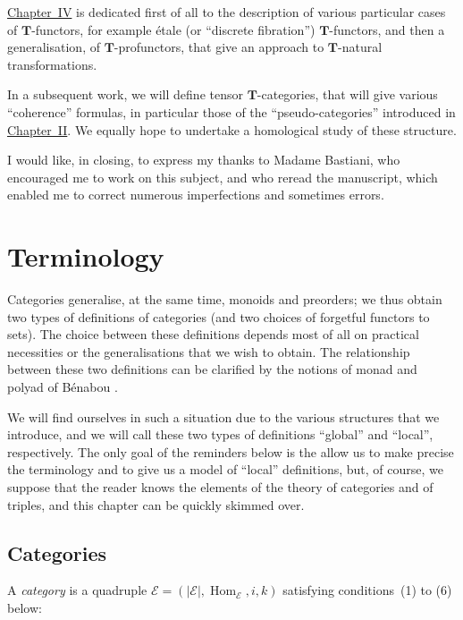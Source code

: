 \documentclass[fleqn]{article}
\newcommand{\oldpage}[1]{\marginpar{\footnotesize$\Big\vert$ \textit{p.~#1}}}
\newcommand{\TT}{\mathbf{T}}
\newcommand{\cat}[1]{\mathcal{#1}}
\newcommand{\set}[1]{|#1|}
\DeclareMathOperator{\Hom}{Hom}
\begin{document}
\hyperref[sec:iv]{Chapter~IV} is dedicated first of all to the description of various particular cases of $\TT$-functors, for example étale (or ``discrete fibration'') $\TT$-functors, and then a generalisation, of $\TT$-profunctors, that give an approach to $\TT$-natural transformations.

In a subsequent work, we will define tensor $\TT$-categories, that will give various ``coherence'' formulas, in particular those of the ``pseudo-categories'' introduced in \hyperref[sec:ii]{Chapter~II}.
We equally hope to undertake a homological study of these structure.

I would like, in closing, to express my thanks to Madame Bastiani, who encouraged me to work on this subject, and who reread the manuscript, which enabled me to correct numerous imperfections and sometimes errors.





\clearpage
\tableofcontents


\clearpage
\setcounter{section}{-1}
\section{Terminology}
\label{sec:0}

\oldpage{219}

Categories generalise, at the same time, monoids and preorders;
we thus obtain two types of definitions of categories (and two choices of forgetful functors to sets).
The choice between these definitions depends most of all on practical necessities or the generalisations that we wish to obtain.
The relationship between these two definitions can be clarified by the notions of monad and polyad of Bénabou \cite{Be}.

We will find ourselves in such a situation due to the various structures that we introduce, and we will call these two types of definitions ``global'' and ``local'', respectively.
The only goal of the reminders below is the allow us to make precise the terminology and to give us a model of ``local'' definitions, but, of course, we suppose that the reader knows the elements of the theory of categories and of triples, and this chapter can be quickly skimmed over.


\subsection{Categories}

A \emph{category} is a quadruple $\cat{E}=(\set{\cat{E}}, \Hom_\cat{E}, i, k)$ satisfying conditions~(1) to (6) below:
\end{document}
